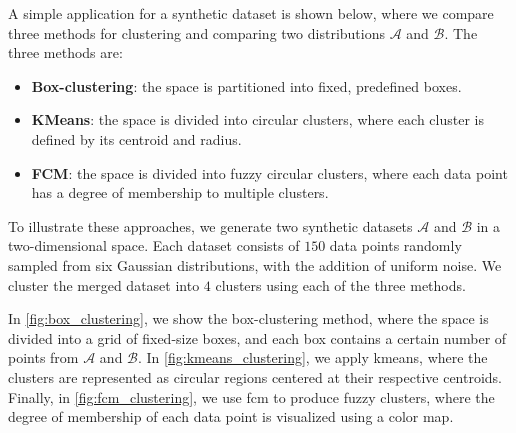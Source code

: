 \begin{modified}
\noindent A simple application for a synthetic dataset is shown below, where we compare three methods for clustering and comparing two distributions $\mathcal{A}$ and $\mathcal{B}$. The three methods are:
\begin{itemize}
	\item \textbf{Box-clustering}: the space is partitioned into fixed, predefined boxes.
	\item \textbf{KMeans}: the space is divided into circular clusters, where each cluster is defined by its centroid and radius.
	\item \textbf{FCM}: the space is divided into fuzzy circular clusters, where each data point has a degree of membership to multiple clusters.
\end{itemize}

\noindent To illustrate these approaches, we generate two synthetic datasets $\mathcal{A}$ and $\mathcal{B}$ in a two-dimensional space. Each dataset consists of $150$ data points randomly sampled from six Gaussian distributions, with the addition of uniform noise. We cluster the merged dataset into $4$ clusters using each of the three methods.

\noindent In \cref{fig:box_clustering}, we show the box-clustering method, where the space is divided into a grid of fixed-size boxes, and each box contains a certain number of points from $\mathcal{A}$ and $\mathcal{B}$. In \cref{fig:kmeans_clustering}, we apply \gls{kmeans}, where the clusters are represented as circular regions centered at their respective centroids. Finally, in \cref{fig:fcm_clustering}, we use \gls{fcm} to produce fuzzy clusters, where the degree of membership of each data point is visualized using a color map.


\end{modified}
